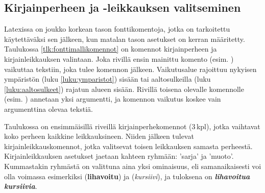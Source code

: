 \subsection{Kirjainperheen ja -leikkauksen valitseminen}
\label{luku:fontit_korkea}

Latexissa on joukko korkean tason fonttikomentoja, jotka on tarkoitettu
käytettäväksi sen jälkeen, kun matalan tason asetukset on kerran
määritetty. Taulukossa \ref{tlk:fonttimallikomennot} on komennot
kirjainperheen ja kirjainleikkauksen valintaan. Joka rivillä ensin
mainittu komento (esim. ) vaikuttaa tekstiin, joka
tulee komennon jälkeen. Vaikutusalue rajoittuu nykyisen ympäristön (luku
\ref{luku:ymparistot}) sisään tai aaltosulkeilla (luku
\ref{luku:aaltosulkeet}) rajatun alueen sisään. Rivillä toisena olevalle
komennolle (esim. ) annetaan yksi argumentti, ja
komennon vaikutus koskee vain argumenttina olevaa tekstiä.


Taulukossa on ensimmäisillä riveillä kirjainperhekomennot (3\,kpl),
jotka vaihtavat koko perheen kaikkine leikkauksineen. Niiden jälkeen
tulevat kirjainleikkauskomennot, jotka valitsevat toisen leikkauksen
samasta perheestä. Kirjainleikkauksen asetukset jaetaan kahteen ryhmään:
 'sarja' ja  'muoto'.
Kummastakin ryhmästä on valittuna aina yksi ominaisuus, eli
samanaikaisesti voi olla voimassa esimerkiksi 
(\textbf{lihavoitu}) ja  (\textit{kursiivi}), ja
tuloksena on \textbf{\itshape lihavoitua kursiivia}.

